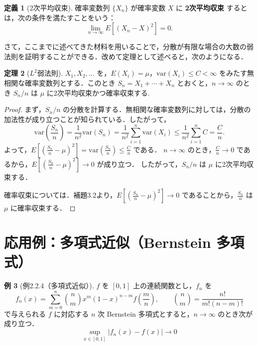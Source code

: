 \documentclass[dvipdfmx]{jsarticle}
\numberwithin{equation}{section}
\theoremstyle{definition}
\newtheorem{thm}{定理}[section]
\newtheorem{dfn}[thm]{定義}
\newtheorem{ex}[thm]{例}
\newcommand{\0}{\bm{0}}
\newcommand{\1}{\bm{1}}
\begin{document}
\begin{dfn}[2次平均収束]
  確率変数列 $\{X_n\}$ が確率変数 $X$ に \textbf{2次平均収束} するとは，次の条件を満たすことをいう：
  \[
    \lim_{n \to \infty} E\left[(X_n - X)^2\right] = 0.
  \] 
\end{dfn}

さて，ここまでに述べてきた材料を用いることで，分散が有限な場合の大数の弱法則を証明することができる．改めて定理として述べると，次のようになる． 
\begin{thm}[$L^2$弱法則]
  $X_1, X_2, \dots$ を，$E(X_i) = \mu$，$\mathrm{var}(X_i) \le C < \infty$ をみたす無相関な確率変数列とする．このとき $S_n = X_1 + \cdots + X_n$ とおくと，$n \to \infty$ のとき $S_n/n$ は $\mu$ に2次平均収束かつ確率収束する.
\end{thm}
\begin{proof}
  
  まず，$S_n/n$ の分散を計算する．無相関な確率変数列に対しては，分散の加法性が成り立つことが知られている．したがって，
  \[
    \mathrm{var}\left(\frac{S_n}{n}\right) = \frac{1}{n^2} \mathrm{var}(S_n) = \frac{1}{n^2} \sum_{i=1}^n \mathrm{var}(X_i) \leq \frac{1}{n^2} \sum_{i=1}^n C = \frac{C}{n}.
  \]
  よって，$E\left[\left(\frac{S_n}{n} - \mu\right)^2\right] = \mathrm{var}\left(\frac{S_n}{n}\right) \leq \frac{C}{n}$ である．
  $n \to \infty$ のとき，$\frac{C}{n} \to 0$ であるから，$E\left[\left(\frac{S_n}{n} - \mu\right)^2\right] \to 0$ が成り立つ．
  したがって，$S_n/n$ は $\mu$ に2次平均収束する．
  
  確率収束については．補題3.2より，$E\left[\left(\frac{S_n}{n} - \mu\right)^2\right] \to 0$ であることから，$\frac{S_n}{n}$ は $\mu$ に確率収束する．
\end{proof}

\section{応用例：多項式近似（Bernstein 多項式）}

\begin{ex}[例2.2.4（多項式近似）]
$f$ を $[0,1]$ 上の連続関数とし，$f_n$ を
\[
  f_n(x) = \sum_{m=0}^n \binom{n}{m} x^m (1-x)^{n-m} f\!\left(\frac{m}{n}\right), \qquad
  \binom{n}{m} = \frac{n!}{m!(n-m)!}
\]
で与えられる $f$ に対応する $n$ 次 Bernstein 多項式とすると，$n \to \infty$ のとき次が成り立つ．
\[
  \sup_{x \in [0,1]} |f_n(x) - f(x)| \to 0
\]
\end{ex}
\end{document}
